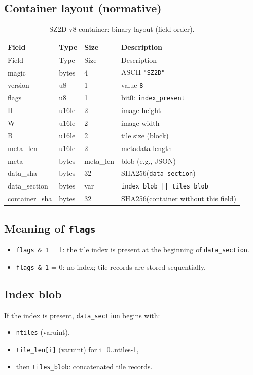 \documentclass[11pt,a4paper]{article}
\begin{document}
\subsection{Container layout (normative)}
\begin{longtable}{@{}llll@{}}
\caption{SZ2D v8 container: binary layout (field order).}
\label{tab:container_layout}\\
\toprule
Field & Type & Size & Description \\
\midrule
\endfirsthead
\toprule
Field & Type & Size & Description \\
\midrule
\endhead
\bottomrule
\endfoot

magic & bytes & 4 & ASCII \texttt{"SZ2D"} \\
version & u8 & 1 & value \texttt{8} \\
flags & u8 & 1 & bit0: \texttt{index\_present} \\
H & u16le & 2 & image height \\
W & u16le & 2 & image width \\
B & u16le & 2 & tile size (block) \\
meta\_len & u16le & 2 & metadata length \\
meta & bytes & meta\_len & blob (e.g., JSON) \\
data\_sha & bytes & 32 & SHA256(\texttt{data\_section}) \\
data\_section & bytes & var & \texttt{index\_blob || tiles\_blob} \\
container\_sha & bytes & 32 & SHA256(container without this field) \\
\end{longtable}

\subsection{Meaning of \texttt{flags}}
\begin{itemize}
  \item \texttt{flags \& 1} = 1: the tile index is present at the beginning of \texttt{data\_section}.
  \item \texttt{flags \& 1} = 0: no index; tile records are stored sequentially.
\end{itemize}

\subsection{Index blob}
If the index is present, \texttt{data\_section} begins with:
\begin{itemize}
  \item \texttt{ntiles} (varuint),
  \item \texttt{tile\_len[i]} (varuint) for i=0..ntiles-1,
  \item then \texttt{tiles\_blob}: concatenated tile records.
\end{itemize}
\end{document}
